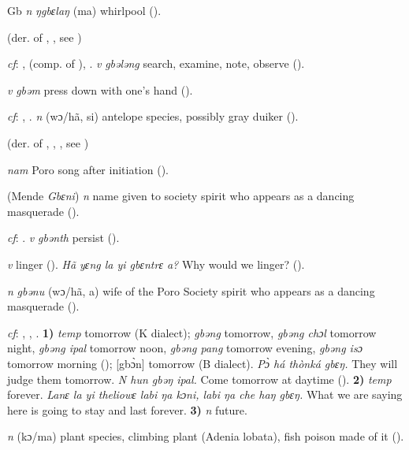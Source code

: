 \begin{letter}{Gb}
 \textit{n} \textit{ŋgbɛlaŋ} (ma) whirlpool (\citealt{Pichl1967}).

 (der. of , , see ) 

 \textit{cf}: ,  (comp. of ), . \textit{v} \textit{gbələng} search, examine, note, observe (\citealt{Pichl1967}).

 \textit{v} \textit{gbəm} press down with one's hand (\citealt{Pichl1967}). 

 \textit{cf}: , . \textit{n} (wɔ/hã, si) antelope species, possibly gray duiker (\citealt{Pichl1967}). 

 (der. of , , , see ) 

 \textit{nam} Poro song after initiation (\citealt{Pichl1967}). 

 (Mende \textit{Gbɛni}) \textit{n} name given to society spirit who appears as a dancing masquerade (\citealt{Pichl1967}). 

 \textit{cf}: . \textit{v} \textit{gbənth} persist (\citealt{Pichl1967}).

 \textit{v} linger (\citealt{Pichl1967}). \textit{Hã yɛng la yi gbɛntrɛ a?} Why would we linger? (\citealt{Pichl1967}). 

 \textit{n} \textit{gbənu} (wɔ/hã, a) wife of the Poro Society spirit who appears as a dancing masquerade (\citealt{Pichl1967}). 

 \textit{cf}: , , . \textbf{1)} \textit{temp} tomorrow (K dialect); \textit{gbəng} tomorrow, \textit{gbəng chɔl} tomorrow night, \textit{gbəng ipal} tomorrow noon, \textit{gbəng pang} tomorrow evening, \textit{gbəng isɔ} tomorrow morning (\citealt{Pichl1967}); [gbɔ̀n] tomorrow (B dialect). \textit{Pɔ̀ há thònká gbɛŋ.} They will judge them tomorrow. \textit{N hun gbəŋ ipal.} Come tomorrow at daytime (\citealt{Pichl1967}). \textbf{2)} \textit{temp} forever. \textit{Lanɛ la yi theliowɛ labi ŋa kɔni, labi ŋa che haŋ gbɛŋ.} What we are saying here is going to stay and last forever. \textbf{3)} \textit{n} future.

 \textit{n} (kɔ/ma) plant species, climbing plant (Adenia lobata), fish poison made of it (\citealt{Pichl1967}). 


\end{letter}
